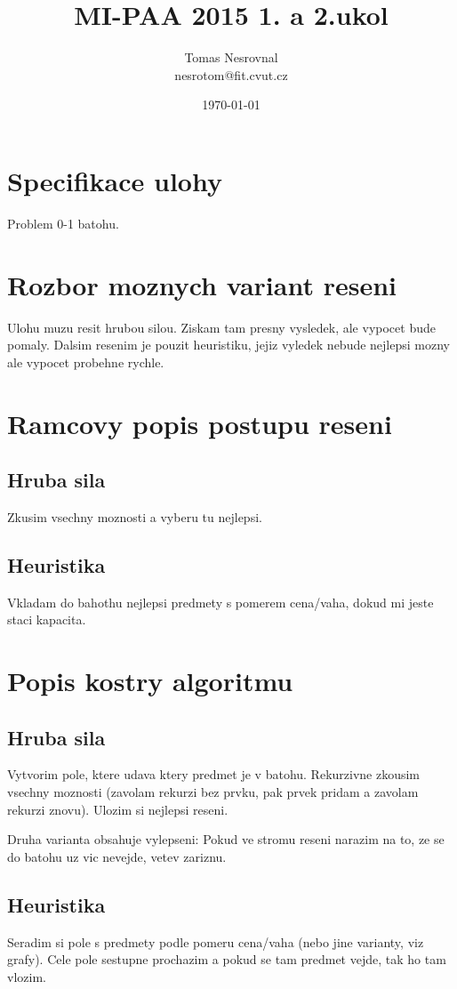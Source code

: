 \documentclass[12pt,a4paper]{article}
\begin{document}
\title{MI-PAA 2015 1. a 2.ukol}
\author{Tomas Nesrovnal\\nesrotom@fit.cvut.cz}
\date{\today}
\maketitle

\section{Specifikace ulohy}
Problem 0-1 batohu.

\section{Rozbor moznych variant reseni}
Ulohu muzu resit hrubou silou. Ziskam tam presny vysledek, ale vypocet bude
pomaly. Dalsim resenim je pouzit heuristiku, jejiz vyledek nebude nejlepsi mozny
ale vypocet probehne rychle.

\section{Ramcovy popis postupu reseni}
\subsection{Hruba sila}
Zkusim vsechny moznosti a vyberu tu nejlepsi.
\subsection{Heuristika}
Vkladam do bahothu nejlepsi predmety s pomerem cena/vaha, dokud
mi jeste staci kapacita.

\section{Popis kostry algoritmu}
\subsection{Hruba sila}
Vytvorim pole, ktere udava ktery predmet je v batohu. Rekurzivne zkousim
vsechny moznosti (zavolam rekurzi bez prvku, pak prvek pridam a zavolam rekurzi znovu).
Ulozim si nejlepsi reseni.

Druha varianta obsahuje vylepseni: Pokud ve stromu reseni narazim na to, ze se do batohu uz vic nevejde, vetev zariznu.
\subsection{Heuristika}
Seradim si pole s predmety podle pomeru cena/vaha (nebo jine varianty, viz grafy). Cele pole sestupne prochazim a pokud se tam predmet vejde, tak ho tam vlozim.
\end{document}
